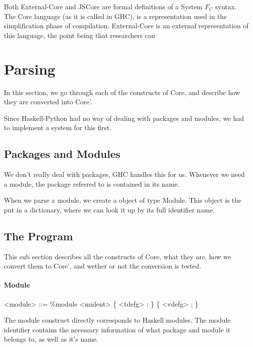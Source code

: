 Both External-Core and JSCore are formal definitions of a System $F_C$ syntax.
The Core language (as it is called in GHC), is a representation used in the 
simplification phase of compilation. External-Core is an external representation 
of this language, the point being that researchers can 
\cite{tolmach2010ghc}

\section{Parsing}

In this section, we go through each of the constructs of Core, and describe
how they are converted into Core'.

Since Haskell-Python had no way of dealing with packages and modules, 
we had to implement a system for this first.

\subsection{Packages and Modules}

We don't really deal with packages, GHC handles this for us. Whenever we
need a module, the package referred to is contained in its name.

When we parse a module, we create a object of type Module. This object is
the put in a dictionary, where we can look it up by its full identifier name.

\subsection{The Program}


This sub section describes all the constructs of Core, what they are, how we 
convert them to Core', and wether or not the conversion is tested.


\paragraph{Module}

\begin{grammar}
<module> ::= \%module <mident> \{ <tdefg> ; \} \{ <vdefg> ; \}
\end{grammar}

The module construct directly corresponds to Haskell modules. The module identifier
contains the necessary information of what package and module it belongs to, as
well as it's name.


